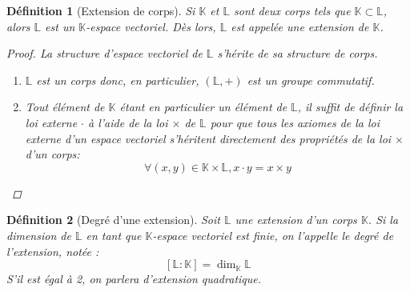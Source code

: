 \documentclass[a4paper,12pt,french,draft]{report}
\newtheorem{definition}{Définition}[section]
\begin{document}
			
			\begin{definition}[Extension de corps]
			
				Si \( \mathbb{K} \) et \( \mathbb{L} \) sont deux corps tels que \(\mathbb{K} \subset  \mathbb{L} \), alors
				\(\mathbb{L}\) est un \(\mathbb{K}\)-espace vectoriel. Dès lors, \(\mathbb{L}\) est appelée une \emph{extension} de \(\mathbb{K}\).
			
				\begin{proof}
					La structure d'espace vectoriel de \(\mathbb{L}\) s'hérite de sa structure de corps.
					\begin{enumerate}
						\item \(\mathbb{L}\) est un corps donc, en particulier, \((\mathbb{L}, +)\) est un groupe commutatif.
						\item Tout élément de \(\mathbb{K}\) étant en particulier un élément de \(\mathbb{L}\), il suffit de définir la loi
						externe \(\cdot\) à l'aide de la loi \( \times \) de \(\mathbb{L}\) pour que tous les axiomes de la loi externe d'un espace vectoriel s'héritent directement des propriétés de la loi \( \times \) d'un corps:
							\[
							\forall (x, y) \in \mathbb{K} \times \mathbb{L}, x \cdot y = x \times y
							\]
					\end{enumerate}
				\end{proof}
			\end{definition}
			
			
			
			
			\begin{definition}[Degré d'une extension]
				Soit \(\mathbb{L}\) une extension d'un corps \(\mathbb{K}\). Si la dimension de \(\mathbb{L}\) en tant que \(\mathbb{K}\)-espace vectoriel est finie, on l'appelle le \emph{degré} de l'extension, notée :
				\[
				[\mathbb{L}:\mathbb{K}] = \dim_\mathbb{K}\mathbb{L}
				\]
				S'il est égal à 2, on parlera d'\emph{extension quadratique}.
			\end{definition}
			
\end{document}
